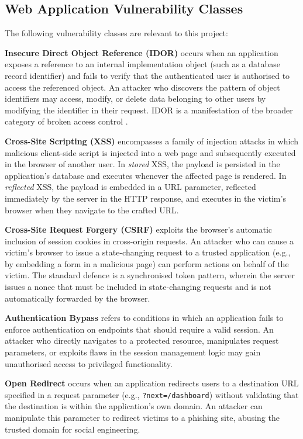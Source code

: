 \subsection{Web Application Vulnerability Classes}

The following vulnerability classes are relevant to this project:

\textbf{Insecure Direct Object Reference (IDOR)} occurs when an application exposes a reference to an internal implementation object (such as a database record identifier) and fails to verify that the authenticated user is authorised to access the referenced object. An attacker who discovers the pattern of object identifiers may access, modify, or delete data belonging to other users by modifying the identifier in their request. IDOR is a manifestation of the broader category of broken access control \cite{owasp2021}.

\textbf{Cross-Site Scripting (XSS)} encompasses a family of injection attacks in which malicious client-side script is injected into a web page and subsequently executed in the browser of another user. In \textit{stored} XSS, the payload is persisted in the application's database and executes whenever the affected page is rendered. In \textit{reflected} XSS, the payload is embedded in a URL parameter, reflected immediately by the server in the HTTP response, and executes in the victim's browser when they navigate to the crafted URL.

\textbf{Cross-Site Request Forgery (CSRF)} exploits the browser's automatic inclusion of session cookies in cross-origin requests. An attacker who can cause a victim's browser to issue a state-changing request to a trusted application (e.g., by embedding a form in a malicious page) can perform actions on behalf of the victim. The standard defence is a synchronised token pattern, wherein the server issues a nonce that must be included in state-changing requests and is not automatically forwarded by the browser.

\textbf{Authentication Bypass} refers to conditions in which an application fails to enforce authentication on endpoints that should require a valid session. An attacker who directly navigates to a protected resource, manipulates request parameters, or exploits flaws in the session management logic may gain unauthorised access to privileged functionality.

\textbf{Open Redirect} occurs when an application redirects users to a destination URL specified in a request parameter (e.g., \texttt{?next=/dashboard}) without validating that the destination is within the application's own domain. An attacker can manipulate this parameter to redirect victims to a phishing site, abusing the trusted domain for social engineering.

